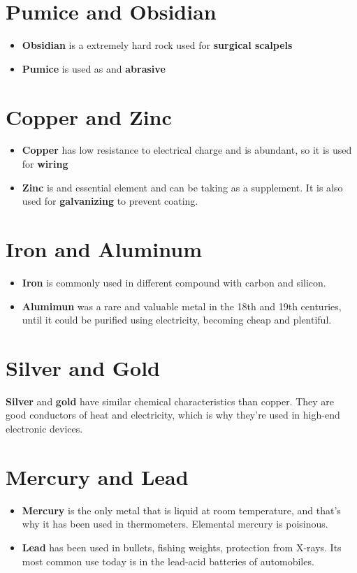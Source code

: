 \documentclass[12pt, letterpaper, twoside]{article}
\begin{document}
\section{Pumice and Obsidian}
	\begin{itemize}
		\item \textbf{Obsidian} is a extremely hard rock used for \textbf{surgical scalpels}
		\item \textbf{Pumice} is used as and \textbf{abrasive}
	\end{itemize}
	
\section{Copper and Zinc}
	\begin{itemize}
		\item \textbf{Copper} has low resistance to electrical charge and is abundant, so it is used for \textbf{wiring}
		\item \textbf{Zinc} is and essential element and can be taking as a supplement. It is also used for \textbf{galvanizing} to prevent coating.
	\end{itemize}

\section{Iron and Aluminum}
	\begin{itemize}
		\item \textbf{Iron} is commonly used in different compound with carbon and silicon.
		\item \textbf{Alumimun} was a rare and valuable metal in the 18th and 19th centuries, until it could be purified using electricity, becoming cheap and plentiful.
	\end{itemize}
	
\section{Silver and Gold}

\textbf{Silver} and \textbf{gold} have similar chemical characteristics than copper. They are good conductors of heat and electricity, which is why they're used in high-end electronic devices.

\section{Mercury and Lead}
	\begin{itemize}
		\item \textbf{Mercury} is the only metal that is liquid at room temperature, and that's why it has been used in thermometers. Elemental mercury is poisinous.
		\item \textbf{Lead} has been used in bullets, fishing weights, protection from X-rays. Its most common use today is in the lead-acid batteries of automobiles.  
	\end{itemize}
	
\end{document}
